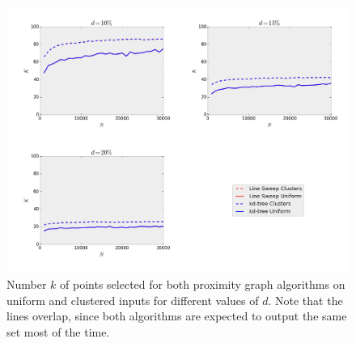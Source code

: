 \begin{figure}[!h] 
	\vspace{-10pt}
	\centering
	\includegraphics[width=\linewidth]{Pictures/ls_kd_k} 
	\caption[Number $k$ of points selected for Line Sweep and $k$-d Tree range search.]{Number $k$ of points selected for both proximity graph algorithms on uniform and clustered inputs for different values of $d$. Note that the lines overlap, since both algorithms are expected to output the same set most of the time.}
	\label{fig:ls_kd_k} 
\end{figure}